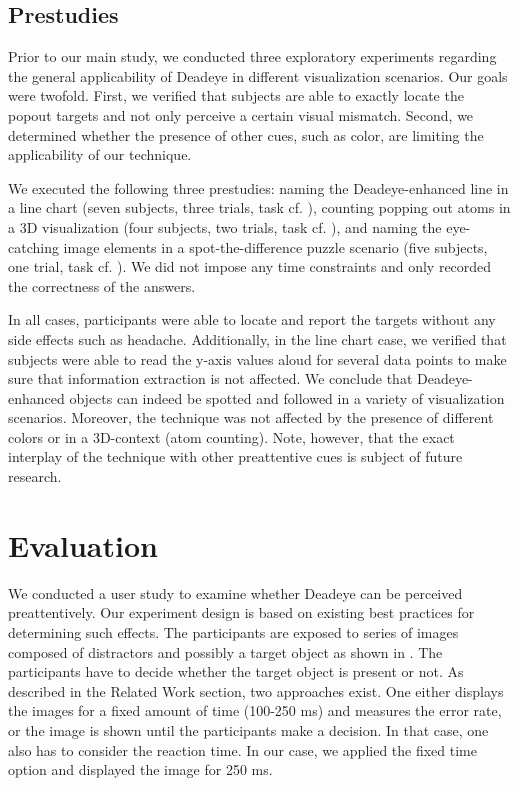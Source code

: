 \documentclass[journal]{vgtc}                %
\begin{document}
\subsection{Prestudies}

Prior to our main study, we conducted three exploratory experiments regarding the general applicability of Deadeye in different visualization scenarios. Our goals were twofold. First, we verified that subjects are able to exactly locate the popout targets and not only perceive a certain visual mismatch. Second, we determined whether the presence of other cues, such as color, are limiting the applicability of our technique.

We executed the following three prestudies: naming the Deadeye-enhanced line in a line chart (seven subjects, three trials, task cf. ), counting popping out atoms in a 3D visualization (four subjects, two trials, task cf. ), and naming the eye-catching image elements in a spot-the-difference puzzle scenario (five subjects, one trial, task cf. ). We did not impose any time constraints and only recorded the correctness of the answers.

In all cases, participants were able to locate and report the targets without any side effects such as headache. Additionally, in the line chart case, we verified that subjects were able to read the y-axis values aloud for several data points to make sure that information extraction is not affected. We conclude that Deadeye-enhanced objects can indeed be spotted and followed in a variety of visualization scenarios. Moreover, the technique was not affected by the presence of different colors or in a 3D-context (atom counting). Note, however, that the exact interplay of the technique with other preattentive cues is subject of future research.


\section{Evaluation}

We conducted a user study to examine whether Deadeye can be perceived preattentively. Our experiment design is based on existing best practices for determining such effects. The participants are exposed to series of images composed of distractors and possibly a target object as shown in . The participants have to decide whether the target object is present or not. As described in the Related Work section, two approaches exist. One either displays the images for a fixed amount of time (100-250 ms) and measures the error rate, or the image is shown until the participants make a decision. In that case, one also has to consider the reaction time. In our case, we applied the fixed time option and displayed the image for 250 ms.
\end{document}
